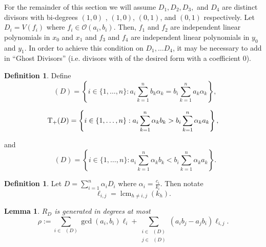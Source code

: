 \documentclass{amsart}
\theoremstyle{plain}
\newtheorem{lem}[thm]{Lemma}
\theoremstyle{definition}
\newtheorem{defn}[thm]{Definition}
\theoremstyle{remark}
\numberwithin{equation}{section}
\newcommand\sco{{\mathscr O}}
\newcommand\bida{a}
\newcommand\bidb{b}
\DeclareMathOperator{\Te}{T_=}
\DeclareMathOperator{\Tp}{T_+}
\DeclareMathOperator{\Tm}{T_-}
\DeclareMathOperator{\lcm}{lcm}
\begin{document}
For the remainder of this section we will assume $D_1, D_2, D_3,$ and $D_4$ are
distinct divisors with bi-degrees $(1,0)$
, $(1,0)$, $(0,1)$, and $(0,1)$ respectively. Let $D_i = V(f_i)$ where
$f_i \in \sco(\bida_i, \bidb_i)$.  
Then, $f_1$ and $f_2$ are independent linear
polynomials in $x_0$ and $x_1$ and $f_3$ and $f_4$ are independent
linear polynomials in $y_0$ and $y_1$.  In order to achieve this condition on
$D_1, \ldots D_4$, it may be necessary to add in ``Ghost Divisors'' (i.e.
divisors with of the desired form with a coefficient $0$).
\begin{defn}
Define 
\begin{equation}
\label{eqn:define-T=(D)}
	\Te(D) = \left\{i \in \{1, \ldots, n\}: \bida_i \sum_{k=1}^n \bidb_k 
\alpha_k = \bidb_i \sum_{k=1}^n \bida_k \alpha_k \right\},
\end{equation}

\begin{equation}
\label{eqn:define-T+(D)}
	\Tp(D) = \left\{ i \in \{1, \ldots, n\}:  \vphantom{\sum_{k = 1}^n} 
	\bida_i \sum_{k = 1}^n \alpha_k \bidb_k > \bidb_i \sum_{k = 1}^n \alpha_k \bida_k 
\right\},
\end{equation}

\noindent
and
\begin{equation}
\label{eqn:define-T-(D)}
	\Tm(D) = \left\{ i \in \{1, \ldots, n\}: \bida_i \sum_{k = 1}^n \alpha_k
	\bidb_k < \bidb_i \sum_{k=1}^n \alpha_k \bida_k \right\}.
\end{equation}
\end{defn}

\begin{defn}\label{def:ell_ij}
Let $D = \sum_{i=1}^n \alpha_i D_i$ where $\alpha_i = \frac{c_i}{k_i}$.
Then notate
\[\ell_{i,j} = \lcm_{h\ne i,j}(k_h).\]
\end{defn}

\begin{lem}
\label{lem:hirz-generators}
$R_D$ is generated in degrees at most
\begin{equation}\label{eqn:def-sigma}
	\rho := \sum_{i \in \Te(D)} \gcd(\bida_i, \bidb_i) \ell_i + \sum_{\substack
	{i \in \Tp(D) \\ j\in \Tm(D)}} (\bida_i \bidb_j - \bida_j \bidb_i)
	\ell	_{i,j}.
\end{equation}
\end{lem}
\end{document}
